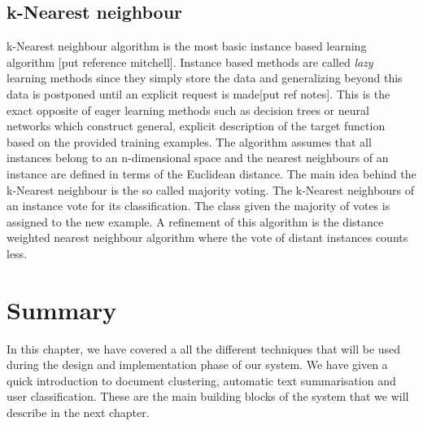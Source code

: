 \subsection{k-Nearest neighbour}
k-Nearest neighbour algorithm is the most basic instance based learning algorithm [put reference mitchell]. Instance based methods are called \emph{lazy} learning methods since they simply store the data and generalizing beyond this data is postponed until an explicit request is made[put ref notes]. This is the exact opposite of eager learning methods such as decision trees or neural networks which construct general, explicit description of the target function based on the provided training examples. The algorithm assumes that all instances belong to an n-dimensional space and the nearest neighbours of an instance are defined in terms of the Euclidean distance. The main idea behind the k-Nearest neighbour is the so called majority voting. The k-Nearest neighbours of an instance vote for its classification. The class given the majority of votes is assigned to the new example. A refinement of this algorithm is the distance weighted nearest neighbour algorithm where the vote of distant instances counts less.  

\section{Summary}
In this chapter, we have covered a all the different techniques that will be used during the design and implementation phase of our system. We have given a quick introduction to document clustering, automatic text summarisation and user classification. These are the main building blocks of the system that we will describe in the next chapter. 


